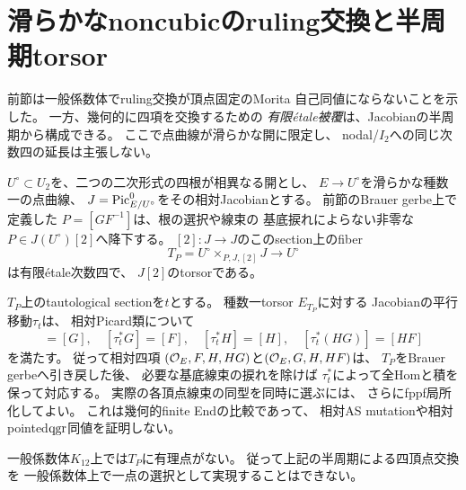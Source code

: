 \section{滑らかなnoncubicのruling交換と半周期torsor}
\label{sec:qa-half-period-ruling}

前節は一般係数体でruling交換が頂点固定のMorita
自己同値にならないことを示した。
一方、幾何的に四項を交換するための
\emph{有限\'{e}tale被覆}は、Jacobianの半周期から構成できる。
ここで点曲線が滑らかな開に限定し、
nodal/$I_2$への同じ次数四の延長は主張しない。

\begin{theorem}[半周期による二pencil交換の次数四torsor]
\label{thm:qa-half-period-ruling-torsor}
$U^\circ\subset U_2$を、二つの二次形式の四根が相異なる開とし、
$E\to U^\circ$を滑らかな種数一の点曲線、
$J=\operatorname{Pic}^0_{E/U^\circ}$をその相対Jacobianとする。
前節のBrauer gerbe上で定義した
$P=[GF^{-1}]$は、根の選択や線束の
基底捩れによらない非零な
$P\in J(U^\circ)[2]$へ降下する。
$[2]:J\to J$のこのsection上のfiber
\begin{equation}
 T_P=U^\circ\times_{P,J,[2]}J
 \xrightarrow{\quad}U^\circ
 \label{eq:qa-half-period-four-cover}
\end{equation}
は有限\'{e}tale次数四で、
$J[2]$のtorsorである。

$T_P$上のtautological sectionを$t$とする。
種数一torsor $E_{T_P}$に対する
Jacobianの平行移動$\tau_t$は、
相対Picard類について
\begin{equation}
 [\tau_t^*F]=[G],\quad
 [\tau_t^*G]=[F],\quad
 [\tau_t^*H]=[H],\quad
 [\tau_t^*(HG)]=[HF]
 \label{eq:qa-half-period-exchange}
\end{equation}
を満たす。
従って相対四項
$(\mathcal O_E,F,H,HG)$と$(\mathcal O_E,G,H,HF)$は、
$T_P$をBrauer gerbeへ引き戻した後、
必要な基底線束の捩れを除けば
$\tau_t^*$によって全Homと積を保って対応する。
実際の各頂点線束の同型を同時に選ぶには、
さらにfppf局所化してよい。
これは幾何的finite Endの比較であって、
相対AS mutationや相対pointed$\operatorname{qgr}$同値を証明しない。

一般係数体$K_{12}$上では$T_P$に有理点がない。
従って上記の半周期による四頂点交換を
一般係数体上で一点の選択として実現することはできない。
\end{theorem}
